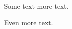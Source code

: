 \documentclass{article}
\begin{document}
	Some text \hspace{1cm} more text.
	
	\vspace{10cm}
	
	Even more text.
\end{document}
